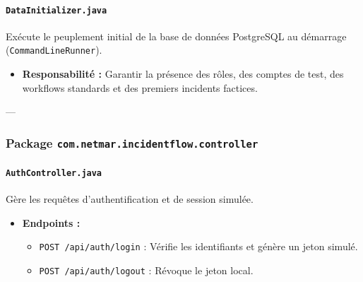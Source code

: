 \documentclass[12pt,a4paper]{article}
\begin{document}
\paragraph{\texttt{DataInitializer.java}}
Exécute le peuplement initial de la base de données PostgreSQL au démarrage (\texttt{CommandLineRunner}).
\begin{itemize}
    \item \textbf{Responsabilité :} Garantir la présence des rôles, des comptes de test, des workflows standards et des premiers incidents factices.
\end{itemize}

---

\subsubsection{Package \texttt{com.netmar.incidentflow.controller}}

\paragraph{\texttt{AuthController.java}}
Gère les requêtes d'authentification et de session simulée.
\begin{itemize}
    \item \textbf{Endpoints :}
        \begin{itemize}
            \item \texttt{POST /api/auth/login} : Vérifie les identifiants et génère un jeton simulé.
            \item \texttt{POST /api/auth/logout} : Révoque le jeton local.
        \end{itemize}
\end{itemize}
\end{document}
